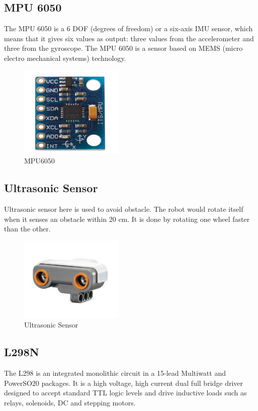 \documentclass{article}
\begin{document}
 	 	
 	\subsection {MPU 6050}
 	The MPU 6050 is a 6 DOF (degrees of freedom) or a six-axis IMU sensor, which means that it gives six values as output: three values from the accelerometer and three from the gyroscope. The MPU 6050 is a sensor based on MEMS (micro electro mechanical systems) technology.
 	
 	\begin{figure}[h]
 		\centering
 		\includegraphics[width=50mm,scale=0.5]{mpu6050}
 		\caption{MPU6050}
 		\label{ MPU6050}
 	\end{figure}
 	
 	 	
 	\pagebreak
 	 
 	\subsection{Ultrasonic Sensor}
 	Ultrasonic sensor here is used to avoid obstacle. The robot would rotate itself when it senses an obstacle within 20 cm. It is done by rotating one wheel faster than the other. 
 	
 	\begin{figure}[h]
 		\centering
 		\includegraphics[width=50mm,scale=0.5]{ultrasonic}
 		\caption{Ultrasonic Sensor}
 		\label{ Ultrasonic Sensor}
 	\end{figure}
 
 	\subsection{L298N}
 	The L298 is an integrated monolithic circuit in a 15-lead Multiwatt and PowerSO20 packages. It is a high voltage, high current dual full bridge driver designed to accept standard TTL logic levels and drive inductive loads such as relays, solenoids, DC and stepping motors. 
 	
\end{document}
